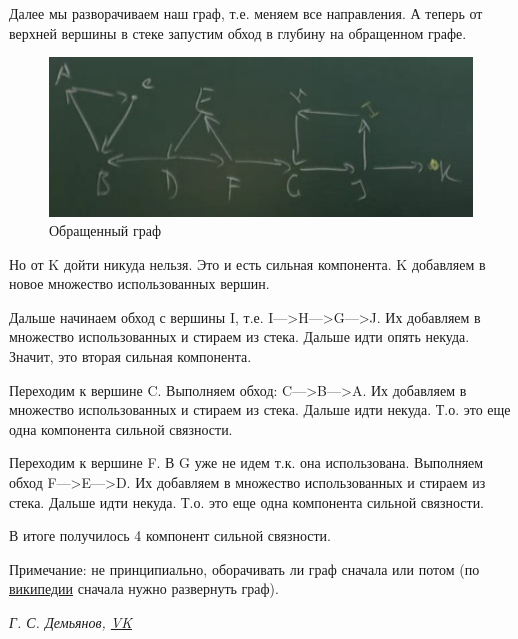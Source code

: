 \documentclass[a4paper,12pt]{article}
\theoremstyle{plain} %
\theoremstyle{definition} %
\theoremstyle{remark} %
\begin{document}
Далее мы разворачиваем наш граф, т.е. меняем все направления. А теперь от верхней вершины в стеке запустим обход в глубину на обращенном графе.

\begin{figure}[h!]
	\centering
	\includegraphics[width=0.5\linewidth]{kos3}
	\caption{Обращенный граф}
\end{figure}

Но от K дойти никуда нельзя. Это и есть сильная компонента. K добавляем в новое множество использованных вершин. 

Дальше начинаем обход с вершины I, т.е. I--->H--->G--->J. Их добавляем в множество использованных и стираем из стека. Дальше идти опять некуда. Значит, это вторая сильная компонента.

Переходим к вершине C. Выполняем обход: C--->B--->A. Их добавляем в множество использованных и стираем из стека. Дальше идти некуда. Т.о. это еще одна компонента сильной связности.

Переходим к вершине F. В G уже не идем т.к. она использована. Выполняем обход F--->E--->D. Их добавляем в множество использованных и стираем из стека. Дальше идти некуда. Т.о. это еще одна компонента сильной связности.

В итоге получилось 4 компонент сильной связности.

Примечание: не принципиально, оборачивать ли граф сначала или потом (по \href{https://ru.wikipedia.org/wiki/%D0%90%D0%BB%D0%B3%D0%BE%D1%80%D0%B8%D1%82%D0%BC_%D0%9A%D0%BE%D1%81%D0%B0%D1%80%D0%B0%D0%B9%D1%8E}{википедии} сначала нужно развернуть граф).
\begin{center}
	\vfill \emph{{\small Г. С. Демьянов, \href{https://vk.com/id37346992}{VK}}}
\end{center}
\end{document}
